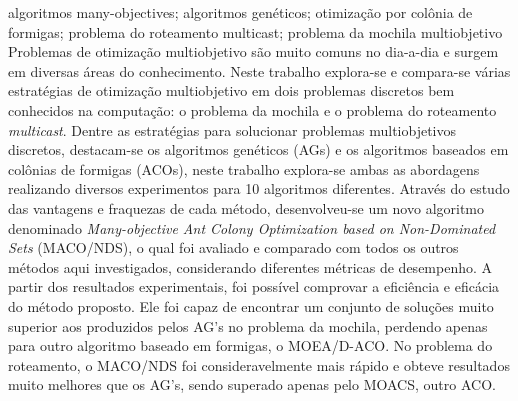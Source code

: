 \documentclass[dissertmst]{ppgco}
\begin{document}
\begin{resumo}{algoritmos many-objectives; algoritmos genéticos; otimização por colônia de formigas; problema do roteamento multicast; problema da mochila multiobjetivo}
	Problemas de otimização multiobjetivo são muito comuns no dia-a-dia e surgem em diversas áreas do conhecimento. Neste trabalho explora-se e compara-se várias estratégias de otimização multiobjetivo em dois problemas discretos bem conhecidos na computação: o problema da mochila e o problema do roteamento \textit{multicast}. Dentre as estratégias para solucionar problemas multiobjetivos discretos, destacam-se os algoritmos genéticos (AGs) e os algoritmos baseados em colônias de formigas (ACOs), neste trabalho explora-se ambas as abordagens realizando diversos experimentos para 10 algoritmos diferentes. Através do estudo das vantagens e fraquezas de cada método, desenvolveu-se um novo algoritmo denominado \textit{Many-objective Ant Colony Optimization based on Non-Dominated Sets} (MACO/NDS), o qual foi avaliado e comparado com todos os outros métodos aqui investigados, considerando diferentes métricas de desempenho. A partir dos resultados experimentais, foi possível comprovar a eficiência e eficácia do método proposto. Ele foi capaz de encontrar um conjunto de soluções muito superior aos produzidos pelos AG's no problema da mochila, perdendo apenas para outro algoritmo baseado em formigas, o MOEA/D-ACO. No problema do roteamento, o MACO/NDS foi consideravelmente mais rápido e obteve resultados muito melhores que os AG's, sendo superado apenas pelo MOACS, outro ACO.
\end{resumo}

\begin{abstract}{many-objective algorithms; genetic algorithms; ant colony optimization; multicast routing problem; multi-objective knapsack problem}
	Multi-objective optimization problems are very common in the day-to-day life and come up in many fields of knowledge. In this work, several strategies for multi-objective optimization have been explored and compared in two well known discrete problems in computer science: the knapsack problem and the multicast routing problem. Among all strategies to solve multi-objective discrete problems, genetic algorithms (GAs) and ant colony optimization (ACO) are the ones who generally provide the best results. In this work both approaches are explored through several experiments involving 10 different algorithms. As a consequence of studying the strengths and weaknesses of each method, a new algorithm has been proposed, the Many-objective Ant Colony Optimization based on Non-Dominated Sets (MACO/NDS), which has been evaluated and compared against all other methods investigated here, considering different performance metrics. It has been capable of finding much superior sets of solutions than the ones yielded by the GAs in the knapsack problem, losing only to another algorithm based on ant colonies, the MOEA/D-ACO. In the routing problem, MACO/NDS was considerably faster and obtained much better results than any GA, being surpassed only by MOACS, another ACO.
\end{abstract}
\end{document}
